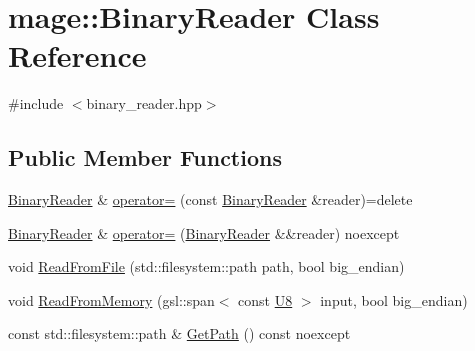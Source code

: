 \hypertarget{classmage_1_1_binary_reader}{}\section{mage\+:\+:Binary\+Reader Class Reference}
\label{classmage_1_1_binary_reader}


{\ttfamily \#include $<$binary\+\_\+reader.\+hpp$>$}

\subsection*{Public Member Functions}
\begin{DoxyCompactItemize}
\item 
\mbox{\hyperlink{classmage_1_1_binary_reader}{Binary\+Reader}} \& \mbox{\hyperlink{classmage_1_1_binary_reader_a0408bb456983b4a03ae42ab69c6f4bc3}{operator=}} (const \mbox{\hyperlink{classmage_1_1_binary_reader}{Binary\+Reader}} \&reader)=delete
\item 
\mbox{\hyperlink{classmage_1_1_binary_reader}{Binary\+Reader}} \& \mbox{\hyperlink{classmage_1_1_binary_reader_a280998bb89dacdcb88ec87c49ce90a02}{operator=}} (\mbox{\hyperlink{classmage_1_1_binary_reader}{Binary\+Reader}} \&\&reader) noexcept
\item 
void \mbox{\hyperlink{classmage_1_1_binary_reader_a38daa2eb250146c537bbc65044a5738f}{Read\+From\+File}} (std\+::filesystem\+::path path, bool big\+\_\+endian)
\item 
void \mbox{\hyperlink{classmage_1_1_binary_reader_a093d95a36bdc45f5d51f48f1ee09bb1f}{Read\+From\+Memory}} (gsl\+::span$<$ const \mbox{\hyperlink{namespacemage_afc638980bc6154f15af5e2d93a0e0ea9}{U8}} $>$ input, bool big\+\_\+endian)
\item 
const std\+::filesystem\+::path \& \mbox{\hyperlink{classmage_1_1_binary_reader_af2c3f4e6a98472a6435dd9d1105b4bc9}{Get\+Path}} () const noexcept
\end{DoxyCompactItemize}

